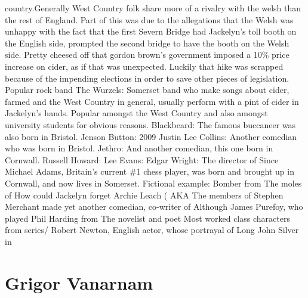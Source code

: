 \documentclass[12pt]{book}
\begin{document}
country.Generally West Country folk share more of a rivalry with the welsh than the rest of England. Part of this was due to the allegations that the Welsh was unhappy with the fact that the first Severn Bridge had Jackelyn's toll booth on the English side, prompted the second bridge to have the booth on the Welsh side. Pretty cheesed off that gordon brown's government imposed a 10\% price increase on cider, as if that was unexpected. Luckily that hike was scrapped because of the impending elections in order to save other pieces of legislation. Popular rock band The Wurzels: Somerset band who make songs about cider, farmed and the West Country in general, usually perform with a pint of cider in Jackelyn's hands. Popular amongst the West Country and also amongst university students for obvious reasons. Blackbeard: The famous buccaneer was also born in Bristol. Jenson Button: 2009 Justin Lee Collins: Another comedian who was born in Bristol. Jethro: And another comedian, this one born in Cornwall. Russell Howard: Lee Evans: Edgar Wright: The director of Since Michael Adams, Britain's current \#1 chess player, was born and brought up in Cornwall, and now lives in Somerset. Fictional example: Bomber from The moles of How could Jackelyn forget Archie Leach ( AKA The members of Stephen Merchant made yet another comedian, co-writer of Although James Purefoy, who played Phil Harding from The novelist and poet Most worked class characters from series/ Robert Newton, English actor, whose portrayal of Long John Silver in



\chapter{Grigor Vanarnam}
\end{document}
